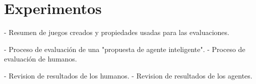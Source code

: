 \chapter{Experimentos}\label{chapter:experiments}

- Resumen de juegos creados y propiedades usadas para las evaluaciones.

- Proceso de evaluación de una "propuesta de agente inteligente".
- Proceso de evaluación de humanos.
 
- Revision de resultados de los humanos.
- Revision de resultados de los agentes.
